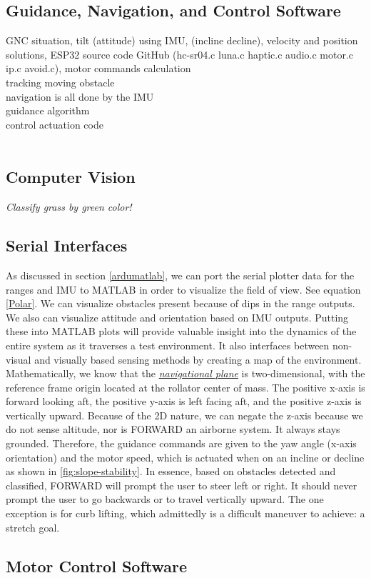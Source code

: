 \subsection{Guidance, Navigation, and Control Software} \label{gnc}
\noindent GNC situation, tilt (attitude) using IMU, (incline decline), velocity and position solutions, ESP32 source code GitHub (hc-sr04.c luna.c haptic.c audio.c motor.c ip.c avoid.c), motor commands calculation\\

tracking moving obstacle\\

navigation is all done by the IMU\\

guidance algorithm\\

control actuation code\\  

\\

\subsection{Computer Vision}
\noindent \textit{Classify grass by green color!}

\subsection{Serial Interfaces}
\noindent As discussed in section \ref{ardumatlab}, we can port the serial plotter data for the ranges and IMU to MATLAB in order to visualize the field of view. See equation \ref{Polar}. We can visualize obstacles present because of dips in the range outputs. We also can visualize attitude and orientation based on IMU outputs. Putting these into MATLAB plots will provide valuable insight into the dynamics of the entire system as it traverses a test environment. It also interfaces between non-visual and visually based sensing methods by creating a map of the environment.\\

\noindent Mathematically, we know that the \underline{\textit{navigational plane}} is two-dimensional, with the reference frame origin located at the rollator center of mass. The positive x-axis is forward looking aft, the positive y-axis is left facing aft, and the positive z-axis is vertically upward. Because of the 2D nature, we can negate the z-axis because we do not sense altitude, nor is FORWARD an airborne system. It always stays grounded. Therefore, the guidance commands are given to the yaw angle (x-axis orientation) and the motor speed, which is actuated when on an incline or decline as shown in \ref{fig:slope-stability}. In essence, based on obstacles detected and classified, FORWARD will prompt the user to steer left or right. It should never prompt the user to go backwards or to travel vertically upward. The one exception is for curb lifting, which admittedly is a difficult maneuver to achieve: a stretch goal.\\

\subsection{Motor Control Software}